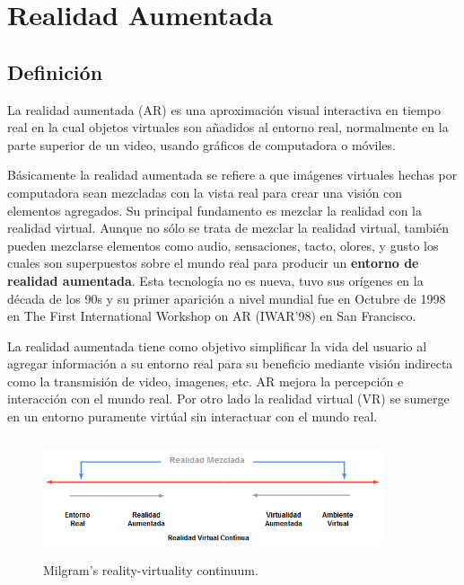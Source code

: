 \newpage
\section{Realidad Aumentada}
\setcounter{secnumdepth}{2}

\subsection{Definición}
La realidad aumentada (AR) es una aproximación visual interactiva en tiempo real en la cual objetos virtuales son añadidos al entorno real, normalmente en la parte superior de un video, usando gráficos de computadora o móviles.\cite{B04} \par
\vspace{5mm}
Básicamente la realidad aumentada se refiere a que imágenes virtuales hechas por computadora sean mezcladas con la vista real para crear una visión con elementos agregados. Su principal fundamento es mezclar la realidad con la realidad virtual. Aunque no sólo se trata de mezclar la realidad virtual, también pueden mezclarse elementos como audio, sensaciones, tacto, olores, y gusto los cuales son superpuestos sobre el mundo real para producir un \textbf{entorno de realidad aumentada}.\cite{B05}
Esta tecnología no es nueva, tuvo sus orígenes en la década de los 90s\cite{B04} y su primer aparición a nivel mundial fue en Octubre de 1998 en The First International Workshop on AR (IWAR'98) en San Francisco\cite{B05}.\par 
\vspace{5mm}
La realidad aumentada tiene como objetivo simplificar la vida del usuario al agregar información a su entorno real para su beneficio mediante visión indirecta como la transmisión de video, imagenes, etc. AR mejora la percepción e interacción con el mundo real. Por otro lado la realidad virtual (VR) se sumerge en un entorno puramente virtúal sin interactuar con el mundo real\cite{B27}.\par
\begin{figure}[h!]
	\centering
	\includegraphics[width=10cm,height=3.5cm]{imagenes/marcoteorico/ar/Mixed_Reallity.png}
	\caption{Milgram’s reality-virtuality continuum.\cite{B27}}
	\label{fig:analogo}
\end{figure}
